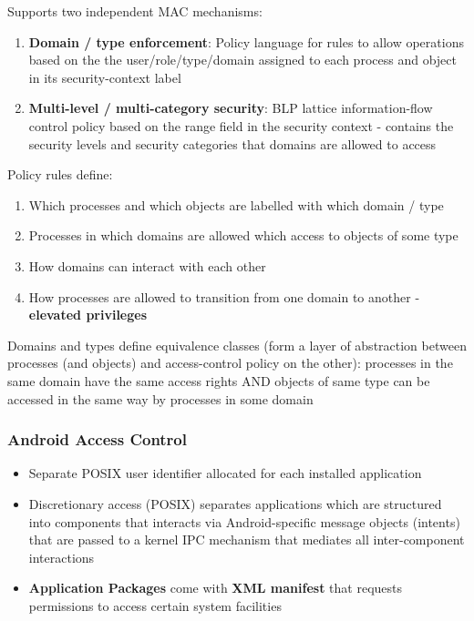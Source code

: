 \documentclass{article}
\begin{document}
\bigskip
Supports two independent MAC mechanisms:
\begin{enumerate}
	\item \textbf{Domain / type enforcement}: Policy language for rules to allow operations based on the the user/role/type/domain assigned to each process and object in its security-context label
	
	\item \textbf{Multi-level / multi-category security}: BLP lattice information-flow control policy based on the range field in the security context - contains the security levels and security categories that domains are allowed to access
\end{enumerate}

Policy rules define:
\begin{enumerate}
	\item Which processes and which objects are labelled with which domain / type
	\item Processes in which domains are allowed which access to objects of some type
	\item How domains can interact with each other
	\item How processes are allowed to transition from one domain to another - \textbf{elevated privileges}
\end{enumerate}
Domains and types define equivalence classes (form a layer of abstraction between processes (and objects) and access-control policy on the other): processes in the same domain have the same access rights AND objects of same type can be accessed in the same way by processes in some domain

\subsubsection{Android Access Control}
\begin{itemize}
	\item Separate POSIX user identifier allocated for each installed application
	\item Discretionary access (POSIX) separates applications which are structured into components that interacts via Android-specific message objects (intents) that are passed to a kernel IPC mechanism that mediates all inter-component interactions
	\item \textbf{Application Packages} come with \textbf{XML manifest} that requests permissions to access certain system facilities
	
\end{itemize}
\end{document}
